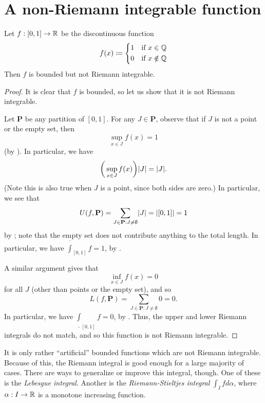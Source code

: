 \section{A non-Riemann integrable function}\label{i:sec:11.7}

\begin{prop}\label{i:11.7.1}
  Let \(f : [0, 1] \to \mathbb{R}\) be the discontinuous function
  \[
    f(x) \coloneqq \begin{dcases}
      1 & \text{if } x \in \mathbb{Q}    \\
      0 & \text{if } x \notin \mathbb{Q}
    \end{dcases}
  \]
  Then \(f\) is bounded but not Riemann integrable.
\end{prop}

\begin{proof}
  It is clear that \(f\) is bounded, so let us show that it is not Riemann integrable.

  Let \(\mathbf{P}\) be any partition of \([0, 1]\).
  For any \(J \in \mathbf{P}\), observe that if \(J\) is not a point or the empty set, then
  \[
    \sup_{x \in J} f(x) = 1
  \]
  (by ).
  In particular, we have
  \[
    \bigg(\sup_{x \in J} f(x)\bigg) \abs{J} = \abs{J}.
  \]
  (Note this is also true when \(J\) is a point, since both sides are zero.)
  In particular, we see that
  \[
    U(f, \mathbf{P}) = \sum_{J \in \mathbf{P} : J \neq \emptyset} \abs{J} = \abs{[0, 1]} = 1
  \]
  by ;
  note that the empty set does not contribute anything to the total length.
  In particular, we have \(\overline{\int}_{[0, 1]} f = 1\), by .

  A similar argument gives that
  \[
    \inf_{x \in J} f(x) = 0
  \]
  for all \(J\) (other than points or the empty set), and so
  \[
    L(f, \mathbf{P}) = \sum_{J \in \mathbf{P} : J \neq \emptyset} 0 = 0.
  \]
  In particular, we have \(\underline{\int}_{[0, 1]} f = 0\), by .
  Thus, the upper and lower Riemann integrals do not match, and so this function is not Riemann integrable.
\end{proof}

\begin{rmk}\label{i:11.7.2}
  It is only rather ``artificial'' bounded functions which are not Riemann integrable.
  Because of this, the Riemann integral is good enough for a large majority of cases.
  There are ways to generalize or improve this integral, though.
  One of these is the \emph{Lebesgue integral}.
  Another is the \emph{Riemann-Stieltjes integral} \(\int_I f d\alpha\), where \(\alpha : I \to \mathbb{R}\) is a monotone increasing function.
\end{rmk}
